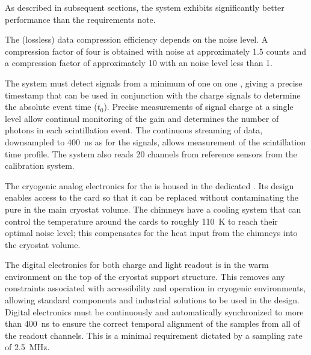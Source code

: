 As described in subsequent sections, %
the system exhibits significantly better performance than the requirements note.

The (lossless) data compression efficiency depends on the noise level. A compression factor of four is obtained with noise at approximately \SI{1.5}{} counts and  
 a compression factor of approximately \num{10} 
with an  noise level less than \SI{1}{}. 


The   system must detect signals from a minimum of one \phel on one , giving a precise timestamp that can be used in conjunction with the charge signals to determine the absolute event time ($t_0$). Precise measurements of  signal charge at a single \phel level allow continual monitoring of the  gain and determines the number of photons in each scintillation event. 
The continuous  streaming of data, downsampled to \SI{400}{ns} as for the  signals, allows measurement of the scintillation time profile. The  system also reads \num{20} channels from reference   sensors from the  calibration system.


The cryogenic analog electronics for the  is housed in the dedicated . Its design enables access to the  card so that it can be replaced without contaminating the pure in the main cryostat volume. The chimneys have a cooling system that can control the temperature around the  cards to roughly \SI{110}{\kelvin} to reach their optimal noise level; this compensates for the heat input from the chimneys into the cryostat volume. 

The digital electronics for both charge and light readout is in the warm environment on the top of the cryostat support structure. %
This removes any constraints associated with  accessibility and operation in cryogenic environments, allowing standard components and industrial solutions to be used in the design. Digital electronics must be continuously and automatically synchronized to more than \SI{400}{\nano\s} to ensure the correct temporal alignment of the  samples from all of the readout channels. This is a minimal requirement dictated by a sampling rate of \SI{2.5}{\MHz}.  

